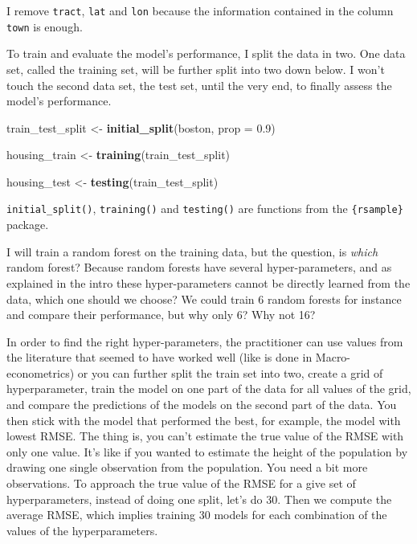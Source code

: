 \documentclass[]{gitbook}
\newenvironment{Shaded}{\begin{snugshade}}{\end{snugshade}}
\newcommand{\DataTypeTok}[1]{\textcolor[rgb]{0.13,0.29,0.53}{#1}}
\newcommand{\FloatTok}[1]{\textcolor[rgb]{0.00,0.00,0.81}{#1}}
\newcommand{\KeywordTok}[1]{\textcolor[rgb]{0.13,0.29,0.53}{\textbf{#1}}}
\newcommand{\NormalTok}[1]{#1}
\newcommand{\StringTok}[1]{\textcolor[rgb]{0.31,0.60,0.02}{#1}}
\theoremstyle{definition}
\theoremstyle{definition}
\theoremstyle{definition}
\theoremstyle{remark}
\begin{document}
I remove \texttt{tract}, \texttt{lat} and \texttt{lon} because the
information contained in the column \texttt{town} is enough.

To train and evaluate the model's performance, I split the data in two.
One data set, called the training set, will be further split into two
down below. I won't touch the second data set, the test set, until the
very end, to finally assess the model's performance.

\begin{Shaded}
\begin{Highlighting}[]
\NormalTok{train_test_split <-}\StringTok{ }\KeywordTok{initial_split}\NormalTok{(boston, }\DataTypeTok{prop =} \FloatTok{0.9}\NormalTok{)}

\NormalTok{housing_train <-}\StringTok{ }\KeywordTok{training}\NormalTok{(train_test_split)}

\NormalTok{housing_test <-}\StringTok{ }\KeywordTok{testing}\NormalTok{(train_test_split)}
\end{Highlighting}
\end{Shaded}

\texttt{initial\_split()}, \texttt{training()} and \texttt{testing()}
are functions from the \texttt{\{rsample\}} package.

I will train a random forest on the training data, but the question, is
\emph{which} random forest? Because random forests have several
hyper-parameters, and as explained in the intro these hyper-parameters
cannot be directly learned from the data, which one should we choose? We
could train 6 random forests for instance and compare their performance,
but why only 6? Why not 16?

In order to find the right hyper-parameters, the practitioner can use
values from the literature that seemed to have worked well (like is done
in Macro-econometrics) or you can further split the train set into two,
create a grid of hyperparameter, train the model on one part of the data
for all values of the grid, and compare the predictions of the models on
the second part of the data. You then stick with the model that
performed the best, for example, the model with lowest RMSE. The thing
is, you can't estimate the true value of the RMSE with only one value.
It's like if you wanted to estimate the height of the population by
drawing one single observation from the population. You need a bit more
observations. To approach the true value of the RMSE for a give set of
hyperparameters, instead of doing one split, let's do 30. Then we
compute the average RMSE, which implies training 30 models for each
combination of the values of the hyperparameters.
\end{document}
